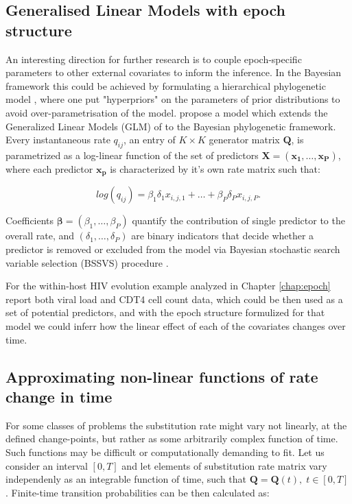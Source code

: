 \subsection{Generalised Linear Models with epoch structure}

An interesting direction for further research is to couple epoch-specific parameters to other external covariates to inform the inference.
In the Bayesian framework this could be achieved by formulating a hierarchical phylogenetic model \citep{Edo-Matas2011}, where one put "hyperpriors" on the parameters of prior distributions to avoid over-parametrisation of the model.
\citet{Lemey2014} propose a model which extends the Generalized Linear Models (GLM) of \citet{Nelder1972} to the Bayesian phylogenetic framework.
Every instantaneous rate $q_{ij}$, an entry of $K \times K$ generator matrix $\mathbf{Q}$, is parametrized as a log-linear function of the set of predictors $\mathbf{X}=\left( \mathbf{x_{1}},\ldots,\mathbf{x_{P}}\right)$, where each predictor $\mathbf{x_{p}}$ is characterized by it's own rate matrix such that:

\begin{equation}
log(q_{ij})=\beta_{1}\delta_{1}x_{i,j,1}+\ldots+\beta_{P}\delta_{P}x_{i,j,P}.
\label{eq:glm}
\end{equation}

Coefficients $\mathbf{\beta}=\left(\beta_{1},\ldots,\beta_{P}\right)$ quantify the contribution of single predictor to the overall rate, and $\left(\delta_{1},\ldots,\delta_{P}\right)$ are binary indicators that decide whether a predictor is removed or excluded from the model via Bayesian stochastic search variable selection (BSSVS) procedure \citep{Kuo1998,Lemey2009}.

For the within-host HIV evolution example analyzed in Chapter \ref{chap:epoch} \citet{Shankarappa99} report both viral load and CDT4 cell count data, which could be then used as a set of potential predictors, and with the epoch structure formulized for that model we could inferr how the linear effect of each of the covariates changes over time.

\subsection{Approximating non-linear functions of rate change in time}

For some classes of problems the substitution rate might vary not linearly, at the defined change-points, but rather as some arbitrarily complex function of time. 
Such functions may be difficult or computationally demanding to fit. 
Let us consider an interval $\left[0,T\right]$ and let elements of substitution rate matrix vary independenly as an integrable function of time, such that $\mathbf{Q}=\mathbf{Q}(t),\; t\in\left[0,T\right]$. 
Finite-time transition probabilities can be then calculated as: 

